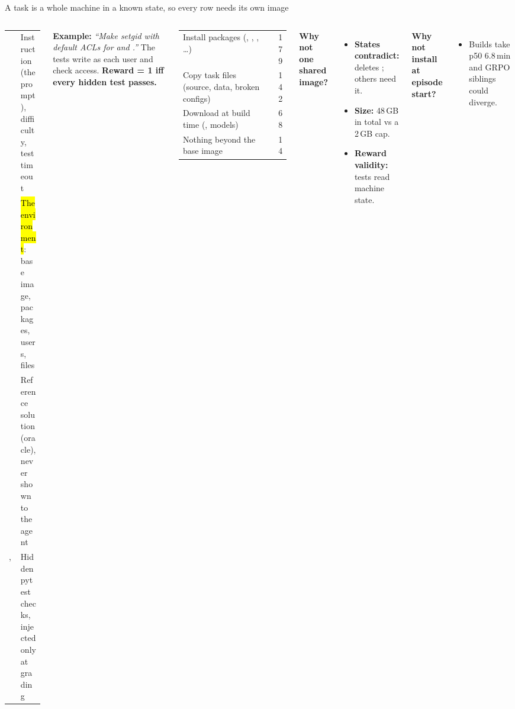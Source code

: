 \begin{frame}{A task is a whole machine in a known state, so every row needs its own image}
\begin{columns}[T]
\scriptsize\setlength{\tabcolsep}{3pt}
\begin{tabularx}{\linewidth}{@{}P{0.33\linewidth}Y@{}}
\toprule
{} & Instruction (the prompt), difficulty, test timeout\\
 & \hl{The environment}: base image, packages, users, files\\
 & Reference solution (oracle), never shown to the agent\\
,  & Hidden pytest checks, injected only at grading\\
\bottomrule
\end{tabularx}
\par\vspace{1mm}
{\tiny\textbf{Example:} \emph{``Make  setgid with default ACLs for  and .''} The tests write as each user and check access. \textbf{Reward = 1 iff every hidden test passes.}\par}
\vspace{1.5mm}
\scriptsize
\begin{tabularx}{\linewidth}{@{}Yr@{}}
\toprule
Install packages (, , , \dots) & 179\\
Copy task files (source, data, broken configs) & 142\\
Download at build time (, models) & 68\\
Nothing beyond the base image & 14\\
\bottomrule
\end{tabularx}
\textbf{\footnotesize Why not one shared image?}
\begin{itemize}\scriptsize\setlength{\itemsep}{0.8mm}
\item \textbf{States contradict:}  deletes ; others need it.
\item \textbf{Size:} 48\,GB in total vs a 2\,GB cap.
\item \textbf{Reward validity:} tests read machine state.
\end{itemize}
\textbf{\footnotesize Why not install at episode start?}
\begin{itemize}\scriptsize\setlength{\itemsep}{0.8mm}
\item Builds take p50 6.8\,min and GRPO siblings could diverge.
\end{itemize}
\end{columns}
\end{frame}

